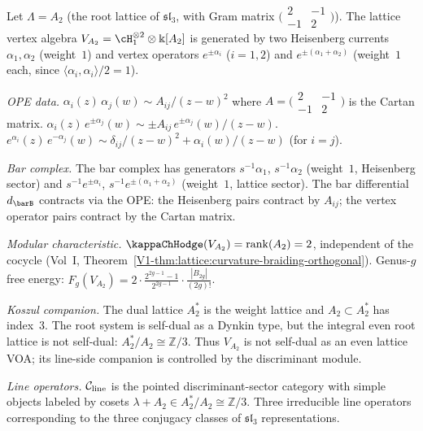 \begin{computation}
Let $\Lambda=A_2$ (the root lattice of $\mathfrak{sl}_3$,
with Gram matrix $\bigl(\begin{smallmatrix}2&-1\\-1&2
\end{smallmatrix}\bigr)$).
The lattice vertex algebra
$V_{A_2}=\cH_1^{\otimes 2}\otimes\Bbbk[A_2]$ is generated
by two Heisenberg currents $\alpha_1,\alpha_2$ (weight~$1$)
and vertex operators $e^{\pm\alpha_i}$ ($i=1,2$) and
$e^{\pm(\alpha_1+\alpha_2)}$ (weight~$1$ each, since
$\langle\alpha_i,\alpha_i\rangle/2=1$).

\emph{OPE data.}
$\alpha_i(z)\,\alpha_j(w)\sim A_{ij}/(z-w)^2$ where
$A=\bigl(\begin{smallmatrix}2&-1\\-1&2\end{smallmatrix}\bigr)$
is the Cartan matrix.
$\alpha_i(z)\,e^{\pm\alpha_j}(w)\sim\pm A_{ij}\,e^{\pm\alpha_j}(w)/(z-w)$.
$e^{\alpha_i}(z)\,e^{-\alpha_j}(w)\sim
\delta_{ij}/(z-w)^2+\alpha_i(w)/(z-w)$ (for $i=j$).

\emph{Bar complex.}
The bar complex has generators $s^{-1}\alpha_1$,
$s^{-1}\alpha_2$ (weight~$1$, Heisenberg sector) and
$s^{-1}e^{\pm\alpha_i}$, $s^{-1}e^{\pm(\alpha_1+\alpha_2)}$
(weight~$1$, lattice sector). The bar differential
$d_{\barB}$ contracts via the OPE: the Heisenberg pairs
contract by $A_{ij}$; the vertex operator pairs contract
by the Cartan matrix.

\emph{Modular characteristic.}
$\kappaChHodge(V_{A_2})=\operatorname{rank}(A_2)=2$, independent
of the cocycle (Vol~I,
Theorem~\ref*{V1-thm:lattice:curvature-braiding-orthogonal}).
Genus-$g$ free energy:
$F_g(V_{A_2})=2\cdot \tfrac{2^{2g-1}-1}{2^{2g-1}}\cdot\tfrac{|B_{2g}|}{(2g)!}$.

\emph{Koszul companion.}
The dual lattice $A_2^*$ is the weight lattice and
$A_2\subset A_2^*$ has index~$3$. The root system is self-dual as a
Dynkin type, but the integral even root lattice is not self-dual:
$A_2^*/A_2\cong\mathbb Z/3$. Thus $V_{A_2}$ is not self-dual as an
even lattice VOA; its line-side companion is controlled by the
discriminant module.

\emph{Line operators.}
$\mathcal C_{\mathrm{line}}$ is the pointed discriminant-sector category with
simple objects labeled by cosets
$\lambda+A_2\in A_2^*/A_2\cong\mathbb Z/3$.
Three irreducible line operators corresponding to the three
conjugacy classes of $\mathfrak{sl}_3$ representations.
\end{computation}


